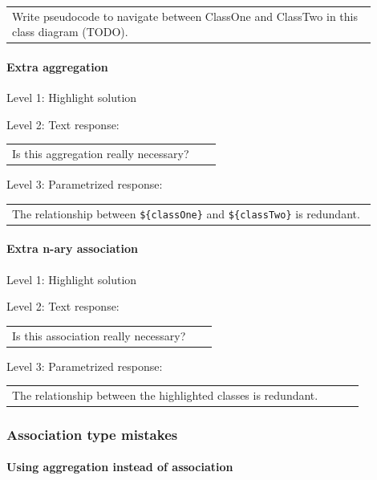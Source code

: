 \begin{tabular}{|p{0.9\linewidth}}
Write pseudocode to navigate between ClassOne and ClassTwo in this class diagram (TODO).
\end{tabular} \medskip


\paragraph{Extra aggregation}

\noindent Level 1: Highlight solution \medskip

\noindent Level 2: Text response: \medskip

\begin{tabular}{|p{0.9\linewidth}}
Is this aggregation really necessary?
\end{tabular} \medskip

\noindent Level 3: Parametrized response: \medskip

\begin{tabular}{|p{0.9\linewidth}}
The relationship between \verb|${classOne}| and \verb|${classTwo}| is redundant.
\end{tabular} \medskip


\paragraph{Extra n-ary association}

\noindent Level 1: Highlight solution \medskip

\noindent Level 2: Text response: \medskip

\begin{tabular}{|p{0.9\linewidth}}
Is this association really necessary?
\end{tabular} \medskip

\noindent Level 3: Parametrized response: \medskip

\begin{tabular}{|p{0.9\linewidth}}
The relationship between the highlighted classes is redundant.
\end{tabular} \medskip


\subsubsection{Association type mistakes}

\paragraph{Using aggregation instead of association}

